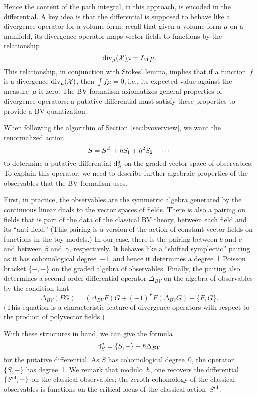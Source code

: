 Hence the content of the path integral, in this approach, is encoded in the differential. 
A key idea is that the differential is supposed to behave like a divergence operator for a volume form:
recall that given a volume form $\mu$ on a manifold, 
its divergence operator maps vector fields to functions by the relationship
\[
{\rm div}_\mu({\mathcal X}) \mu = L_{\mathcal X} \mu.
\] 
This relationship, in conjunction with Stokes' lemma, 
implies that if a function~$f$ is a divergence ${\rm div}_\mu({\mathcal X})$,
then $\int f \mu = 0$,
i.e., its expected value against the measure~$\mu$ is zero.
The BV formalism axiomatizes general properties of divergence operators;
a putative differential must satisfy these properties to provide a BV quantization.

When following the algorithm of Section~\ref{sec:bvoverview},
we want the renormalized action
\[
S = S^{\rm cl} + \hbar S_1 + \hbar^2 S_2 + \cdots
\]
to determine a putative differential ${\rm d}^q_S$ on the graded vector space of observables.
To explain this operator, we need to describe further algebraic properties of the observables
that the BV formalism uses.

First, in practice, the observables are the symmetric algebra generated by the continuous linear duals to the vector spaces of fields.
There is also a pairing on fields that is part of the data of the classical BV theory,
between each field and its ``anti-field.''
(This pairing is a version of the action of constant vector fields on functions in the toy models.)
In our case, there is the pairing between $b$ and $c$ and between $\beta$ and~$\gamma$, respectively.
It behaves like a ``shifted symplectic'' pairing as it has cohomological degree~$-1$,
and hence it determines a degree~1 Poisson bracket $\{-,-\}$ on the graded algebra of observables.
Finally, the pairing also determines a second-order differential operator $\Delta_{BV}$ on the algebra of observables by the condition that
\[
\Delta_{BV}(FG) = (\Delta_{BV}F)G + (-1)^F F(\Delta_{BV}G) + \{F,G\}.
\]
(This equation is a characteristic feature of divergence operators with respect to the product of polyvector fields.)

With these structures in hand, we can give the formula
\[
{\rm d}^q_S=\{S,-\} + \hbar\Delta_{BV}
\]
for the putative differential.
As $S$ has cohomological degree~0, the operator $\{S,-\}$ has degree~1.
We remark that modulo~$\hbar$, one recovers the differential $\{S^{\rm cl},-\}$ on the classical observables;
the zeroth cohomology of the classical observables is functions on the critical locus of the classical action~$S^{\rm cl}$.

